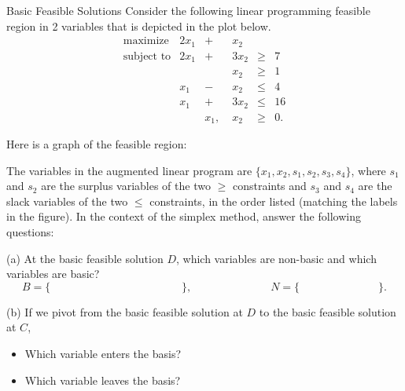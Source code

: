 \begin{ex}{Basic Feasible Solutions}{}
\label{ex:bfs-graphical-pivot}
 Consider the following linear programming feasible region in 2 variables that is depicted in the plot below.   
$$
\begin{array}{rrrrrl}
\text{maximize} & 2x_{1} & + & x_{2} \\
\text{subject to} & 2x_{1} & + & 3x_{2} & \geq & 7 \\
& & & x_{2} & \geq & 1 \\
& x_{1} & - & x_{2} & \leq & 4 \\
& x_{1} & + & 3x_{2} & \leq & 16 \\
& & x_{1},\; & x_{2} & \geq & 0.
\end{array}
$$

Here is a graph of the feasible region:
\begin{center}
\par{}\label{fig:desmos-graph-slacks}%

\end{center}

The variables in the augmented linear program are $\{x_1, x_2, s_1, s_2, s_3, s_4\}$, where $s_1$ and $s_2$ are the surplus variables of the two $\geq$ constraints and $s_3$ and $s_4$ are the slack variables of the two $\leq$ constraints, in the order listed (matching the labels in the figure).
In the context of  the simplex method, answer the following questions:

(a)   At the basic feasible solution $D$, which variables are non-basic and which variables are basic?
$$
B = \big\{ \hspace{5cm} \big\}, \hspace{3cm}  N = \big\{ \hspace{3cm} \big\}. 
$$

(b) If we pivot from the basic feasible solution at $D$ to the basic feasible solution at $C$,
\begin{itemize}
\item Which variable enters the basis?\\
\item Which variable leaves the basis?
\end{itemize}
\end{ex}


